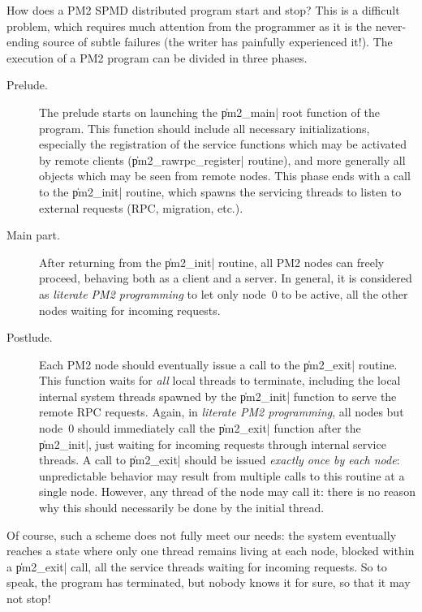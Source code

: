 How does a PM2 SPMD distributed program start and stop? This is a
difficult problem, which requires much attention from the programmer
as it is the never-ending source of subtle failures (the writer has
painfully experienced it!). The execution of a PM2 program can be
divided in three phases.
\begin{description}
  
\item[Prelude.] The prelude starts on launching the \|pm2_main| root
  function of the program. This function should include all necessary
  initializations, especially the registration of the service
  functions which may be activated by remote clients
  (\|pm2_rawrpc_register| routine), and more generally all objects
  which may be seen from remote nodes. This phase ends with a call to
  the \|pm2_init| routine, which spawns the servicing threads to
  listen to external requests (RPC, migration, etc.).
  
\item[Main part.] After returning from the \|pm2_init| routine, all
  PM2 nodes can freely proceed, behaving both as a client and a
  server. In general, it is considered as \emph{literate PM2
    programming} to let only node~0 to be active, all the other nodes
  waiting for incoming requests.
  
\item[Postlude.] Each PM2 node should eventually issue a call to the
  \|pm2_exit| routine. This function waits for \emph{all} local
  threads to terminate, including the local internal system threads
  spawned by the \|pm2_init| function to serve the remote RPC
  requests.  Again, in \emph{literate PM2 programming}, all nodes but
  node~0 should immediately call the \|pm2_exit| function after the
  \|pm2_init|, just waiting for incoming requests through internal
  service threads. A call to \|pm2_exit| should be issued
  \emph{exactly once by each node}: unpredictable behavior may result
  from multiple calls to this routine at a single node. However, any
  thread of the node may call it: there is no reason why this should
  necessarily be done by the initial thread.

\end{description}
Of course, such a scheme does not fully meet our needs: the system
eventually reaches a state where only one thread remains living at
each node, blocked within a \|pm2_exit| call, all the service threads
waiting for incoming requests. So to speak, the program has
terminated, but nobody knows it for sure, so that it may not stop!
